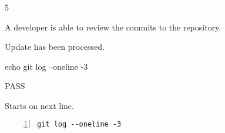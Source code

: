 \begin{description}[align=right,leftmargin=3.2cm,labelindent=3.0cm]
\item[Step:] 5
\item[Confirm:] A developer is able to review the commits to the repository.
\item[Expectation:] Update has been processed.
\item[Command:] echo git  log --oneline -3
\item[Test Result:] PASS
\item[Evidence:] Starts on next line.
\end{description}
\begin{lstlisting}[numbers=left]
git log --oneline -3

\end{lstlisting}
